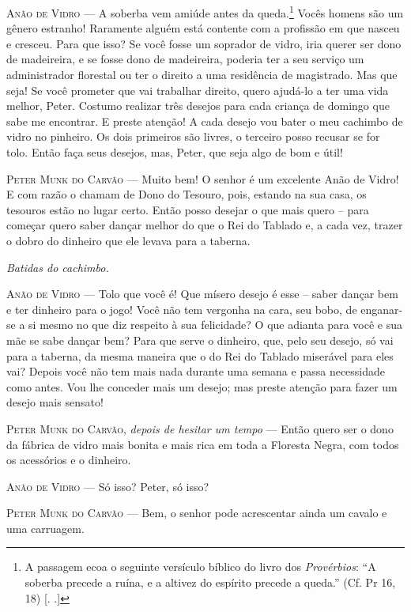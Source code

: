\textsc{Anão de Vidro} --- A soberba vem amiúde antes da queda.\footnote{A
  passagem ecoa o seguinte versículo bíblico do livro dos
  \emph{Provérbios}: ``A soberba precede a ruína, e a altivez do
  espírito precede a queda.'' (Cf. Pr 16, 18) [. .]} Vocês
homens são um gênero estranho! Raramente alguém está contente com a
profissão em que nasceu e cresceu. Para que isso? Se você fosse um
soprador de vidro, iria querer ser dono de madeireira, e se fosse dono
de madeireira, poderia ter a seu serviço um administrador florestal ou
ter o direito a uma residência de magistrado. Mas que seja! Se você
prometer que vai trabalhar direito, quero ajudá-lo a ter uma vida
melhor, Peter. Costumo realizar três desejos para cada criança de
domingo que sabe me encontrar. E preste atenção! A cada desejo vou bater
o meu cachimbo de vidro no pinheiro. Os dois primeiros são livres, o
terceiro posso recusar se for tolo. Então faça seus desejos, mas, Peter,
que seja algo de bom e útil!

\textsc{Peter Munk do Carvão} --- Muito bem! O senhor é um excelente Anão de
Vidro! E com razão o chamam de Dono do Tesouro, pois, estando na sua
casa, os tesouros estão no lugar certo. Então posso desejar o que mais
quero -- para começar quero saber dançar melhor do que o Rei do Tablado
e, a cada vez, trazer o dobro do dinheiro que ele levava para a taberna.

\emph{Batidas do cachimbo.}

\textsc{Anão de Vidro} --- Tolo que você é! Que mísero desejo é esse -- saber
dançar bem e ter dinheiro para o jogo! Você não tem vergonha na cara,
seu bobo, de enganar-se a si mesmo no que diz respeito à sua felicidade?
O que adianta para você e sua mãe se sabe dançar bem? Para que serve o
dinheiro, que, pelo seu desejo, só vai para a taberna, da mesma maneira
que o do Rei do Tablado miserável para eles vai? Depois você não tem
mais nada durante uma semana e passa necessidade como antes. Vou lhe
conceder mais um desejo; mas preste atenção para fazer um desejo mais
sensato!

\textsc{Peter Munk do Carvão}, \emph{depois de hesitar um tempo} --- Então quero
ser o dono da fábrica de vidro mais bonita e mais rica em toda a
Floresta Negra, com todos os acessórios e o dinheiro.

\textsc{Anão de Vidro} --- Só isso? Peter, só isso?

\textsc{Peter Munk do Carvão} --- Bem, o senhor pode acrescentar ainda um cavalo e
uma carruagem.

